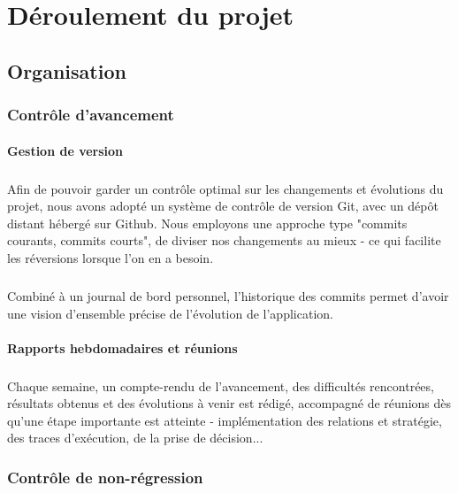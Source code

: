 \documentclass[a4paper,10pt]{report}
\begin{document}
\chapter{Déroulement du projet}
\section{Organisation}
\subsection{Contrôle d'avancement}

\subsubsection{Gestion de version}
\paragraph{}
  Afin de pouvoir garder un contrôle optimal sur les changements et évolutions
du projet, nous avons adopté un système de contrôle de version Git, avec un
dépôt distant hébergé sur Github. Nous employons une approche type "commits
courants, commits courts", de diviser nos changements au mieux - ce qui facilite
les réversions lorsque l'on en a besoin.

\paragraph{}
  Combiné à un journal de bord personnel, l'historique des commits permet
d'avoir une vision d'ensemble précise de l'évolution de l'application.

\subsubsection{Rapports hebdomadaires et réunions}
\paragraph{}
  Chaque semaine, un compte-rendu de l'avancement, des difficultés rencontrées,
résultats obtenus et des évolutions à venir est rédigé, accompagné de réunions
dès qu'une étape importante est atteinte - implémentation des relations et
stratégie, des traces d'exécution, de la prise de décision...


\subsection{Contrôle de non-régression}
\end{document}
